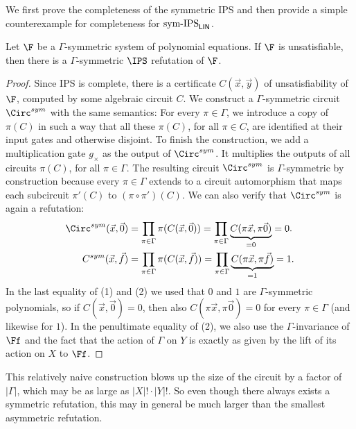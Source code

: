 \documentclass[a4paper,UKenglish,cleveref, autoref, thm-restate]{lipics-v2021}
\newcommand{\symIPSlin}{\text{ \upshape sym-IPS}_{\mathsf{LIN}}}
\begin{document}
We first prove the completeness of the symmetric IPS and then provide a simple counterexample for completeness for$\symIPSlin$. 
\begin{theorem}
	\label{thm:symIPScomplete}
	Let $\F$ be a $\Gamma$-symmetric system of polynomial equations.
	If $\F$ is unsatisfiable, then there
	is a $\Gamma$-symmetric $\IPS$ refutation of $\F$.
\end{theorem}
\begin{proof}
	Since IPS is complete, there is a certificate $C(\vec x, \vec y)$
	of unsatisfiability of $\F$, computed by some algebraic circuit $C$. We construct a $\Gamma$-symmetric circuit $\Circ^{sym}$ with the same semantics: For every $\pi \in \Gamma$, we introduce a copy of $\pi(C)$ in such a way that all these $\pi(C)$, for all $\pi \in C$, are identified at their input gates and otherwise disjoint. 
	To finish the construction, we add a multiplication gate $g_\times$ as the output of $\Circ^{sym}$. 
	It multiplies the outputs of all circuits $\pi(C)$, for all $\pi \in \Gamma$.
	The resulting circuit $\Circ^{sym}$ is $\Gamma$-symmetric by construction because every $\pi \in \Gamma$ extends to a circuit automorphism
	that maps each subcircuit $\pi'(C)$ to $(\pi \circ \pi')(C)$. We can also verify that $\Circ^{sym}$ is again a refutation:
	\begin{align}
		\Circ^{sym}(\vec x, \vec 0)
		 &= \prod_{\pi \in \Gamma}\pi (C(\vec x, \vec 0))
		 = \prod_{\pi \in \Gamma}\underbrace{C(\pi \vec x, \pi \vec 0)}_{= 0}
		= 0.\\
		{C}^{sym}(\vec x, \vec f)
		 &= \prod_{\pi \in \Gamma}\pi (C(\vec x, \vec f))
		 = \prod_{\pi \in \Gamma}\underbrace{C(\pi \vec x,\pi \vec f)}_{= 1}
		= 1.
	\end{align}	
	In the last equality of (1) and (2) we used that $0$ and $1$ are $\Gamma$-symmetric polynomials, so if $C(\vec x, \vec 0) = 0$, then also $C(\pi \vec x, \pi \vec 0) = 0$ for every $\pi \in \Gamma$ (and likewise for $1$).
	In the penultimate equality of (2), we also use the $\Gamma$-invariance of $\Ff$ and the fact that the action of $\Gamma$ on $Y$ is exactly as given by the lift of its action on $X$ to $\Ff$.
\end{proof}
This relatively naive construction blows up the size of the circuit by a factor of $|\Gamma|$, which may be as large as $|X|! \cdot |Y|!$. So even though there always exists a symmetric refutation, this may in general be much larger than the smallest asymmetric refutation.
\end{document}
